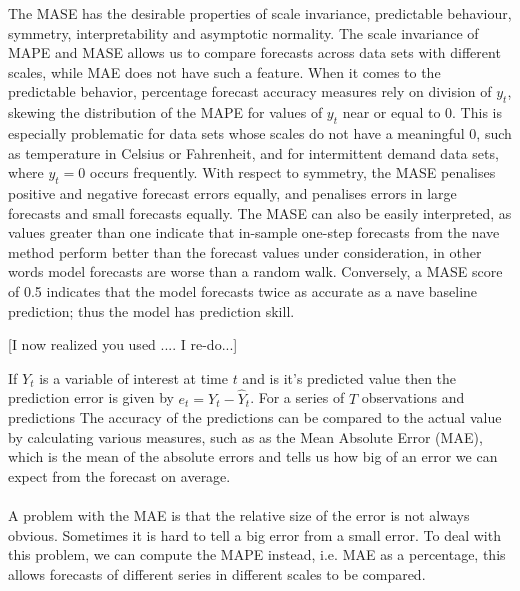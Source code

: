 The MASE has the desirable properties of scale invariance, predictable behaviour, symmetry, interpretability and asymptotic normality. The scale invariance of MAPE and MASE allows us to compare forecasts across data sets with different scales, while MAE does not have such a feature. When it comes to the predictable behavior, percentage forecast accuracy measures rely on division of $y_{t}$, skewing the distribution of the MAPE for values of $y_{t}$ near or equal to 0. This is especially problematic for data sets whose scales do not have a meaningful 0, such as temperature in Celsius or Fahrenheit, and for intermittent demand data sets, where $y_{t}=0$  occurs frequently. With respect to symmetry, the MASE penalises positive and negative forecast errors equally, and penalises errors in large forecasts and small forecasts equally. The MASE can also be easily interpreted, as values greater than one indicate that in-sample one-step forecasts from the nave method perform better than the forecast values under consideration, in other words model forecasts are worse than a random walk. Conversely, a MASE score of 0.5 indicates that the model forecasts twice as accurate as a nave baseline prediction; thus the model has prediction skill.

[I now realized you used \iffalse.... I re-do...] 

\iffalse
If $Y_t$ is a variable of interest at time $t$ and  is it's predicted value then the prediction error is given by $e_t = Y_t - \hat{Y}_t$. For a series of $T$ observations and predictions The accuracy of the predictions can be compared to the actual value by calculating various measures, such as as the Mean Absolute Error (MAE), which is the mean of the absolute errors and tells us how big of an error we can expect from the forecast on average. \\

 \\

A problem with the MAE is that the relative size of the error is not always obvious. Sometimes it is hard to tell a big error from a small error. To deal with this problem, we can compute the MAPE instead, i.e. MAE as a percentage, this allows forecasts of different series in different scales to be compared.\\

\\

